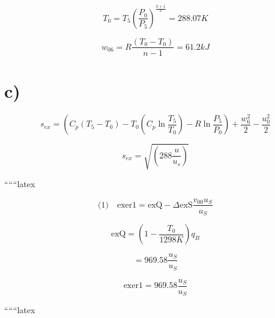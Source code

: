 \[
T_0 = T_5 \left( \frac{P_0}{P_5} \right)^{\frac{k+1}{k}} = 288.07 K
\]

\[
w_{06} = R \frac{(T_0 - T_0)}{n-1} = 61.2 kJ
\]

\section*{c)}

\[
s_{ex} = (C_p (T_5 - T_0) - T_0 (C_p \ln \frac{T_5}{T_0}) - R \ln \frac{P_5}{P_0}) + \frac{w_6^2}{2} - \frac{u_0^2}{2}
\]

\[
s_{ex} = \sqrt{(288 \frac{u}{u_s})}
\]

``````latex


\[
\text{(1)} \quad \text{exer1} = \text{exQ} - \Delta \text{exS} \frac{v_{00} u_{S}}{u_{S}}
\]

\[
\text{exQ} = \left(1 - \frac{T_0}{1298K}\right) q_B
\]

\[
= 969.58 \frac{u_{S}}{u_{S}}
\]

\[
\text{exer1} = 969.58 \frac{u_{S}}{u_{S}}
\]

``````latex


